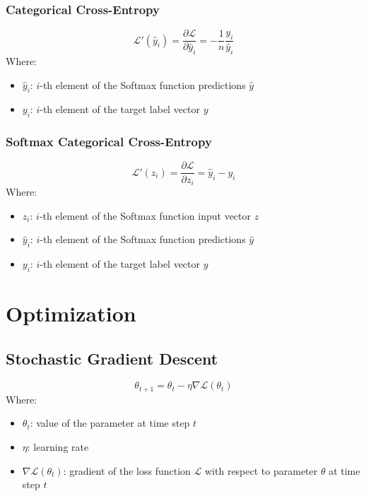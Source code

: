 \documentclass[a4paper]{article}
\newcommand{\haty}{\hat{y}}
\newcommand{\ELL}{\mathcal{L}}
\begin{document}
\subsubsection*{Categorical Cross-Entropy}
\begin{equation*}
    \ELL'(\haty_i) = \frac{\partial\ELL}{\partial \haty_i} = -\frac{1}{n}\frac{y_i}{\haty_i}
\end{equation*}
Where:
\begin{itemize}
    \item $\haty_i$: $i$-th element of the Softmax function predictions $\haty$
    \item $y_i$: $i$-th element of the target label vector $y$
\end{itemize}

\subsubsection*{Softmax Categorical Cross-Entropy}
\begin{equation*}
    \ELL'(z_i) = \frac{\partial\ELL}{\partial z_i} = \haty_i - y_i
\end{equation*}
Where:
\begin{itemize}
    \item $z_i$: $i$-th element of the Softmax function input vector $z$
    \item $\haty_i$: $i$-th element of the Softmax function predictions $\haty$
    \item $y_i$: $i$-th element of the target label vector $y$
\end{itemize}

\pagebreak
\section*{Optimization}

\subsection*{Stochastic Gradient Descent}
\begin{equation*}
    \theta_{t+1} = \theta_t - \eta \nabla\ELL(\theta_t)
\end{equation*}
Where:
\begin{itemize}
    \item $\theta_t$: value of the parameter at time step $t$
    \item $\eta$: learning rate
    \item $\nabla\ELL(\theta_t)$: gradient of the loss function $\ELL$ with respect to parameter $\theta$ at time step $t$
\end{itemize}
\end{document}
